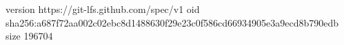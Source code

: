 version https://git-lfs.github.com/spec/v1
oid sha256:a687f72aa002c02ebc8d1488630f29e23c0f586cd66934905e3a9ecd8b790edb
size 196704
